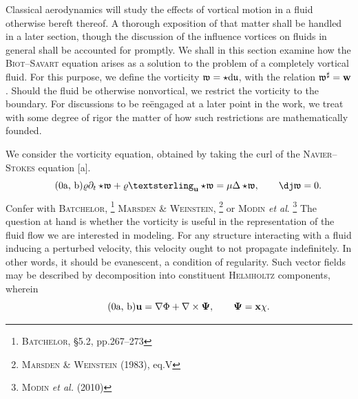 Classical aerodynamics will study the effects of vortical motion in a fluid otherwise bereft thereof.
A thorough exposition of that matter shall be handled in a later section, though the discussion of the influence vortices on fluids in general shall be accounted for promptly.
We shall in this section examine how the \textsc{Biot}--\textsc{Savart} equation arises as a solution to the problem of a completely vortical fluid.
For this purpose, we define the vorticity $\mathfrak{w} = \star\mathrm{d}\mathfrak{u}$, with the relation $\mathfrak{w}^{\sharp} = \mathbf{w}$.
Should the fluid be otherwise nonvortical, we restrict the vorticity to the boundary.
For discussions to be reëngaged at a later point in the work, we treat with some degree of rigor the matter of how such restrictions are mathematically founded.

We consider the vorticity equation, obtained by taking the curl of the \textsc{Navier}--\textsc{Stokes} equation \subeqref{\ref{eq:Navier-Stokes}}[a].
\begin{subequations}\label{eq:vorticity-equation}
         \begin{equation}\tag{\theequation{a, b}}
           \varrho\deet\star\!\vorticityfrak + \varrho\lieder{\uvec}\star\!\vorticityfrak = \mu\Delta\star\!\vorticityfrak, \qquad \codee\vorticityfrak = 0.
         \end{equation}
\end{subequations}
Confer with \textsc{Batchelor},%
\footnote{%
        \cite{batchelor2007introduction} \textsc{Batchelor}, \S5.2, pp.267--273
}
\textsc{Marsden} \& \textsc{Weinstein},%
\footnote{%
        \cite{marsden1983coadjoint} \textsc{Marsden} \& \textsc{Weinstein} (1983), eq.V
}
or \textsc{Modin} \emph{et al}.%
\footnote{%
        \cite{modin2010geodesics} \textsc{Modin} \emph{et al.} (2010)
}
The question at hand is whether the vorticity is useful in the representation of the fluid flow we are interested in modeling.
For any structure interacting with a fluid inducing a perturbed velocity, this velocity ought to not propagate indefinitely.
In other words, it should be evanescent, a condition of regularity.
Such vector fields may be described by decomposition into constituent \textsc{Helmholtz} components, wherein
\begin{subequations}\label{eq:Helmholtz_decomposition}
        \begin{equation}\tag{\theequation{a, b}}
            \uvec = \nabla \Phi + \nabla \times \mathbf{\Psi}, \qquad \mathbf{\Psi} = \xvec\chi.
        \end{equation}
\end{subequations}
